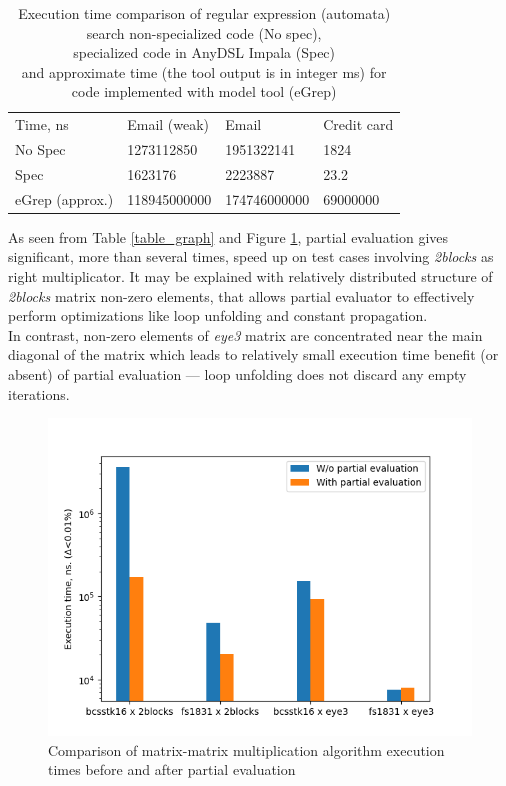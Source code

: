 \documentclass[conference]{IEEEtran}
\begin{document}
\begin{table}[]
	\begin{tabular}{llll}
		Time, ns        & Email (weak) & Email        & Credit card \\
		No Spec         & 1273112850   & 1951322141   & 1824        \\
		Spec            & 1623176      & 2223887      & 23.2        \\
		eGrep (approx.) & 118945000000 & 174746000000 & 69000000          
	\end{tabular}
	\centering
	\caption{Execution time comparison of regular expression (automata) search non-specialized code (No spec),\\ specialized code in AnyDSL Impala (Spec) \\ and approximate time (the tool output is in integer ms) for code implemented with model tool (eGrep)}
	\label{table_regex}
\end{table}

As seen from Table \ref{table_graph} and Figure \ref{fig:multpe}, partial evaluation gives significant, more than several times, speed up on test cases involving \textit{2blocks} as right multiplicator. It may be explained with relatively distributed structure of \textit{2blocks} matrix non-zero elements, that allows partial evaluator to effectively perform optimizations like loop unfolding and constant propagation.\\
In contrast, non-zero elements of \textit{eye3} matrix are concentrated near the main diagonal of the matrix which leads to relatively small execution time benefit (or absent) of partial evaluation --- loop unfolding does not discard any empty iterations.

\begin{figure}[H]
	\centering
	\includegraphics[scale=0.6]{matrix-mult}
	\caption{Comparison of matrix-matrix multiplication algorithm execution times before and after partial evaluation}
	\label{fig:multpe}
\end{figure}
\end{document}
